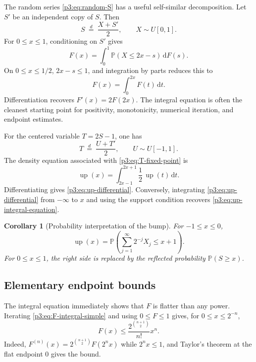 \documentclass[11pt]{article}
\numberwithin{equation}{section}
\newtheorem{corollary}[theorem]{Corollary}
\theoremstyle{definition}
\theoremstyle{remark}
\newcommand{\upf}{\operatorname{up}}
\newcommand{\dd}{\,\mathrm d}
\begin{document}
The random series \eqref{p3:eq:random-S} has a useful self-similar decomposition.  Let $S'$ be an independent copy of $S$.  Then
\begin{equation}\label{p3:eq:S-fixed-point}
 S\ \stackrel{d}{=}\ \frac{X+S'}2,
 \qquad X\sim U[0,1].
\end{equation}
For $0\le x\le1$, conditioning on $S'$ gives
\begin{equation}\label{p3:eq:F-integral-fixed-point}
 F(x)=\int_0^1\mathbb P(X\le2x-s)\dd F(s).
\end{equation}
On $0\le x\le1/2$, $2x-s\le1$, and integration by parts reduces this to
\begin{equation}\label{p3:eq:F-integral-simple}
 F(x)=\int_0^{2x}F(t)\dd t.
\end{equation}
Differentiation recovers $F'(x)=2F(2x)$.  The integral equation is often the cleanest starting point for positivity, monotonicity, numerical iteration, and endpoint estimates.

For the centered variable $T=2S-1$, one has
\begin{equation}\label{p3:eq:T-fixed-point}
 T\ \stackrel{d}{=}\ \frac{U+T'}2,
 \qquad U\sim U[-1,1].
\end{equation}
The density equation associated with \eqref{p3:eq:T-fixed-point} is
\begin{equation}\label{p3:eq:up-integral-equation}
 \upf(x)=\int_{2x-1}^{2x+1}\frac12\,\upf(t)\dd t.
\end{equation}
Differentiating gives \eqref{p3:eq:up-differential}.  Conversely, integrating \eqref{p3:eq:up-differential} from $-\infty$ to $x$ and using the support condition recovers \eqref{p3:eq:up-integral-equation}.

\begin{corollary}[Probability interpretation of the bump]\label{p3:cor:up-probability}
For $-1\le x\le0$,
\begin{equation}\label{p3:eq:up-CDF}
 \upf(x)=\mathbb P\!\left(\sum_{j=1}^{\infty}2^{-j}X_j\le x+1\right).
\end{equation}
For $0\le x\le1$, the right side is replaced by the reflected probability $\mathbb P(S\ge x)$.
\end{corollary}

\subsection{Elementary endpoint bounds}

The integral equation immediately shows that $F$ is flatter than any power.  Iterating \eqref{p3:eq:F-integral-simple} and using $0\le F\le1$ gives, for $0\le x\le2^{-n}$,
\begin{equation}\label{p3:eq:basic-flat-bound}
 F(x)\le \frac{2^{\binom{n+1}{2}}}{n!}x^n.
\end{equation}
Indeed, $F^{(n)}(x)=2^{\binom{n+1}{2}}F(2^nx)$ while $2^nx\le1$, and Taylor's theorem at the flat endpoint $0$ gives the bound.
\end{document}
